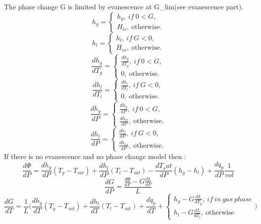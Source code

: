 The phase change G is limited by evanescence at G_{lim}(see evanescence part).
\begin{equation}
    h_g=\begin{cases} h_g,\ if\ 0<G, \\ H_{ls},\ \text{otherwise}.   \end{cases}
\end{equation}
\begin{equation}
    h_l=\begin{cases} h_l,\ if\ G<0, \\ H_{vs},\ \text{otherwise}.   \end{cases}
\end{equation}
\begin{equation}
    \frac{dh_g}{dT_g}=\begin{cases}\frac{dh_g}{dT_g},\ if\ 0<G, \\ 0,\ \text{otherwise}.   \end{cases}
\end{equation}
\begin{equation}
    \frac{dh_l}{dT_l}=\begin{cases}\frac{dh_l}{dT_l},\ if\  G<0, \\ 0,\ \text{otherwise}.   \end{cases}
\end{equation}
\begin{equation}
    \frac{dh_g}{dP}=\begin{cases}\frac{dh_g}{dP},\ if\ 0<G, \\ \frac{dh_{ls}}{dP},\ \text{otherwise}.   \end{cases}
\end{equation}
\begin{equation}
    \frac{dh_l}{dP}=\begin{cases}\frac{dh_l}{dP},\ if\ G<0, \\ \frac{dh_{vs}}{dP},\ \text{otherwise}.   \end{cases}
\end{equation}
If there is no evanescence and no phase change model then :
\begin{equation}
   \frac{d\Phi}{dP}=\frac{dh_g}{dP}(T_g-T_{sat})+\frac{dh_l}{dP}(T_l-T_{sat})-\frac{dT_sat}{dP}(h_g-h_{l})+\frac{dq_p}{dP}\frac{1}{vol}
\end{equation}
\begin{equation}
   \frac{dG}{dP}=\frac{\frac{d\Phi}{dP}-G\frac{dL}{dP}}{L}
\end{equation}
\begin{equation}
   \frac{dG}{dT}=\frac{1}{L}\Bigg(\frac{dh_g}{dT}(T_g-T_{sat})+\frac{dh_l}{dT}(T_l-T_{sat})+\frac{dq_p}{dT}+\begin{cases}h_g-G\frac{dL}{dT_g},\ if\ in\ gas\ phase \\ h_l-G\frac{dL}{dT_l},\ \text{otherwise} \end{cases}\Bigg)
\end{equation}
